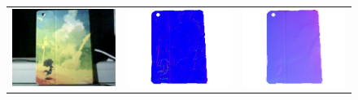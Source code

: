 \begin{figure}[!ht]
\centering
\setlength{\tabcolsep}{0.1em} %
 {\renewcommand{\arraystretch}{1.6}%
\begin{tabular}{c|c c}
   \includegraphics[height = 0.24\linewidth]{figures/result/robust_padback_rgb2.pdf} 
   &
   \includegraphics[height = 0.23\linewidth]{figures/result/rgbd_padback_normal.pdf} &
   \includegraphics[height = 0.23\linewidth]{figures/result/robust_padback_normal.pdf} \\


\end{tabular}}
\end{figure}
